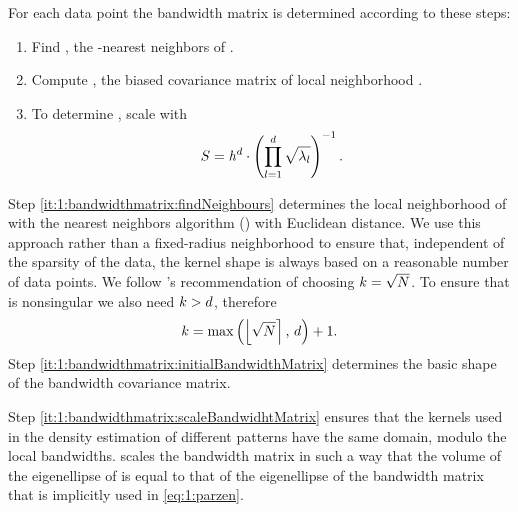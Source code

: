 	For each data point \varPattern the bandwidth matrix is determined according to these steps:
		\begin{enumerate}[labelindent=0ex]
			\item \label{it:1:bandwidthmatrix:findNeighbours}
				Find \varNeighborhood{\varPattern}, the \KNNK-nearest neighbors of \varPattern.
			\item \label{it:1:bandwidthmatrix:initialBandwidthMatrix}
				Compute \varCovarianceMatrix, the biased covariance matrix  of local neighborhood \varNeighborhood{\varPattern}.
			\item \label{it:1:bandwidthmatrix:scaleBandwidhtMatrix}
				To determine \varBandwidthMatrix, scale \varCovarianceMatrix with
				\begin{equation}\label{eq:method:scalingFactor}
					S = \mathit{h}^{d} \cdot \left({\displaystyle\prod_{l = 1}^{d} \sqrt{\lambda_{l}}}\right)^{-1}.
				\end{equation}
		\end{enumerate}	
			Step \ref{it:1:bandwidthmatrix:findNeighbours} determines the local neighborhood of \varPattern with the \KNNK nearest neighbors algorithm (\KNN) with Euclidean distance. We use this approach rather than a fixed-radius neighborhood to ensure that, independent of the sparsity of the data, the kernel shape is always based on a reasonable number of data points. 
			We follow \citeauthor{silverman1986density}'s \cite{silverman1986density} recommendation of choosing $k = \sqrt{N}$. To ensure that \varCovarianceMatrix is nonsingular we also need $k > d$, therefore
			\begin{equation*}
				k = \max\left(\left\lfloor \sqrt{N} \right\rceil,\, d \right) + 1.	
			\end{equation*}
			Step \ref{it:1:bandwidthmatrix:initialBandwidthMatrix} determines the basic shape of the bandwidth covariance matrix. 

			Step \ref{it:1:bandwidthmatrix:scaleBandwidhtMatrix} ensures that the kernels used in the density estimation of different patterns have the same domain, modulo the local bandwidths.  scales the bandwidth matrix in such a way that the volume of the eigenellipse of \varBandwidthMatrix is equal to that of the eigenellipse of the bandwidth matrix that is implicitly used in \cref{eq:1:parzen}. 